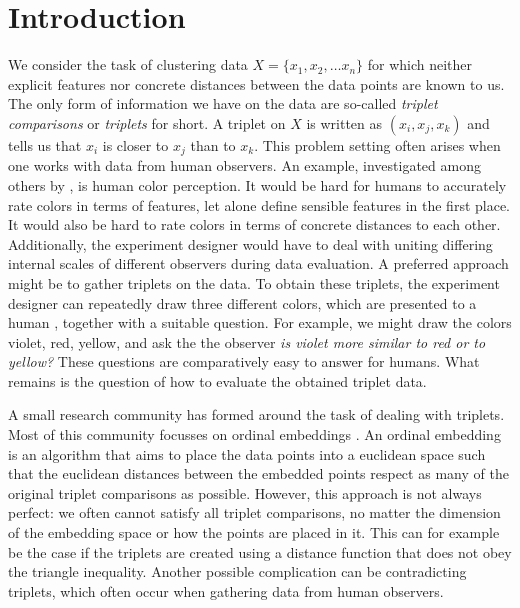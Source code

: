 \chapter{Introduction}\label{Introduction}
We consider the task of clustering data $X = \{x_1, x_2, \ldots x_n \}$ for which neither 
explicit features nor concrete distances between the data points are known to us. 
The only form of information we have on the data are so-called 
\textit{triplet comparisons} or \textit{triplets} for short. A triplet 
on $X$ is written as $(x_i, x_j, x_k)$ and tells us that $x_i$ is closer to $x_j$ than to $x_k$. 
This problem setting often arises when one works with data from human observers. 
An example, investigated among others by \citep{shepardAnalysisProximitiesMultidimensional1962}, 
is human color perception. It would be hard for humans to accurately rate colors in 
terms of features, let alone define sensible features in the first place.  It would also be hard to rate colors in terms of concrete distances to each other.
Additionally, the experiment designer would have to deal with uniting differing internal scales of different observers during data evaluation. 
A preferred approach might be to gather triplets on the data. 
To obtain these triplets, the experiment designer can repeatedly draw
three different colors, which are presented to a human , together with a 
suitable question. For example, we might draw the colors violet, red, yellow,
and ask the the observer \textit{is violet more similar to red or to yellow?} These questions
are comparatively easy to answer for humans. 
What remains is the question of how to evaluate the obtained triplet data.

A small research community has formed around the task of dealing with triplets.
Most of this community focusses on ordinal embeddings
\citep{agarwalGeneralizedNonmetricMultidimensional2007, tamuzAdaptivelyLearningCrowd2011,
laurensvandermaatenStochasticTripletEmbedding2012,   teradaLocalOrdinalEmbedding2014, jainFiniteSamplePrediction2016, ghoshLandmarkOrdinalEmbedding2019, andertonScalingOrdinalEmbedding2019}.
An ordinal embedding is an algorithm that aims to place the data points into a euclidean space
such that the euclidean distances between the embedded points respect as many of the original triplet comparisons as possible. 
However, this approach is not always perfect: we often cannot satisfy all triplet comparisons, 
no matter the dimension of the embedding space or how the points are placed in it. 
This can for example be the case if the triplets are created using a distance function that does not obey the triangle inequality. Another possible complication can be contradicting triplets,
which often occur when gathering data from human observers. 

